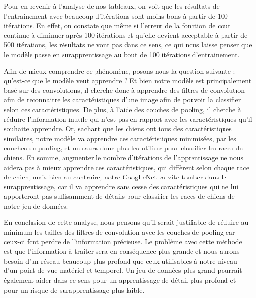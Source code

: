 \documentclass{article}
\begin{document}
Pour en revenir à l’analyse de nos tableaux, on voit que les résultats de
l’entrainement avec beaucoup d’itérations sont moins bons à partir de 100
itérations. En effet, on constate que même si l’erreur de la fonction de cout
continue à diminuer après 100 itérations et qu’elle devient acceptable à partir
de 500 itérations, les résultats ne vont pas dans ce sens, ce qui nous laisse
penser que le modèle passe en surapprentissage au bout de 100 itérations
d’entrainement. 

Afin de mieux comprendre ce phénomène, posons-nous la question suivante :
qu’est-ce que le modèle veut apprendre ? Et bien notre modèle est principalement
basé sur des convolutions, il cherche donc à apprendre des filtres de
convolution afin de reconnaitre les caractéristiques d’une image afin de pouvoir
la classifier selon ces caractéristiques. De plus, à l’aide des couches de
pooling, il cherche à réduire l’information inutile qui n’est pas en rapport
avec les caractéristiques qu’il souhaite apprendre. Or, sachant que les chiens
ont tous des caractéristiques similaires, notre modèle va apprendre ces
caractéristiques minimisées, par les couches de pooling, et ne saura donc plus
les utiliser pour classifier les races de chiens. En somme, augmenter le nombre
d’itérations de l’apprentissage ne nous aidera pas à mieux apprendre ces
caractéristiques, qui diffèrent selon chaque race de chien, mais bien au
contraire, notre GoogLeNet va vite tomber dans le surapprentissage, car il va
apprendre sans cesse des caractéristiques qui ne lui apporteront pas
suffisamment de détails pour classifier les races de chiens de notre jeu de
données. 

En conclusion de cette analyse, nous pensons qu’il serait justifiable de réduire
au minimum les tailles des filtres de convolution avec les couches de pooling
car ceux-ci font perdre de l’information précieuse. Le problème avec cette
méthode est que l’information à traiter sera en conséquence plus grande et nous
aurons besoin d’un réseau beaucoup plus profond que ceux utilisables à notre
niveau d’un point de vue matériel et temporel. Un jeu de données plus grand
pourrait également aider dans ce sens pour un apprentissage de détail plus
profond et pour un risque de surapprentissage plus faible.



\end{document}
